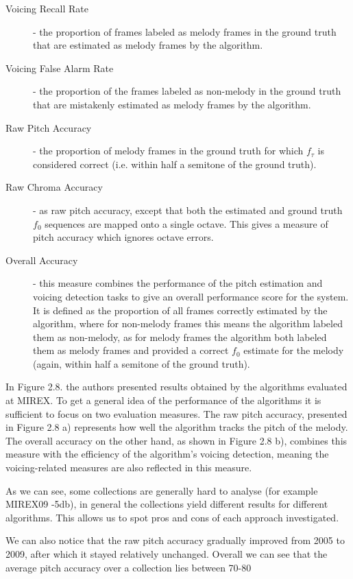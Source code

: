 \begin{description}
\item[Voicing Recall Rate] - the proportion of frames labeled as melody frames in the ground truth that are estimated as melody frames by the algorithm.
\item[Voicing False Alarm Rate] - the proportion of the frames labeled as non-melody in the ground truth that are mistakenly estimated as melody frames by the algorithm.
\item[Raw Pitch Accuracy] - the proportion of melody frames in the ground truth for which $f_{\tau}$ is considered correct (i.e. within half a semitone of the ground truth). 
\item[Raw Chroma Accuracy] - as raw pitch accuracy, except that both the estimated and ground truth $f_{0}$ sequences are mapped onto a single octave. This gives a measure of pitch accuracy which ignores octave errors.
\item[Overall Accuracy] - this measure combines the performance of the pitch estimation and voicing detection tasks to give an overall performance score for the system. It is defined as the proportion of all frames correctly estimated by the algorithm, where for non-melody frames this means the algorithm labeled them as non-melody, as for melody frames the algorithm both labeled them as melody frames and provided a correct $f_{0}$ estimate for the melody (again, within half a semitone of the ground truth).
\end{description}

In Figure 2.8. the authors presented results obtained by the algorithms evaluated at MIREX. To get a general idea of the performance of the algorithms it is sufficient to focus on two evaluation measures.
The raw pitch accuracy, presented in Figure 2.8 a) represents how well the algorithm tracks the pitch of the melody. The overall accuracy on the other hand, as shown in Figure 2.8 b), combines this measure with the efficiency of the algorithm's voicing detection, meaning the voicing-related measures are also reflected in this measure.

As we can see, some collections are generally hard to analyse (for example MIREX09 -5db), in general the collections yield different results for different algorithms. This allows us to spot pros and cons of each approach investigated.

We can also notice that the raw pitch accuracy gradually improved from 2005 to 2009, after which it stayed relatively unchanged. Overall we can see that the average pitch accuracy over a collection lies between 70-80%

